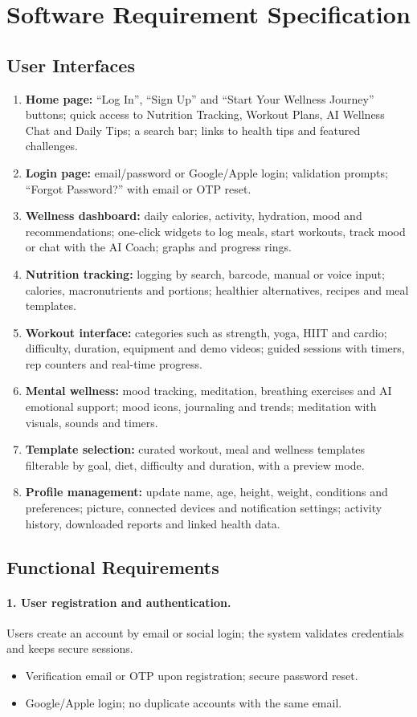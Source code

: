 \documentclass[11pt,a4paper]{report}
\begin{document}
\section{Software Requirement Specification}
\subsection{User Interfaces}
\begin{enumerate}
 \item \textbf{Home page:} ``Log In'', ``Sign Up'' and ``Start Your Wellness Journey'' buttons; quick access to Nutrition Tracking, Workout Plans, AI Wellness Chat and Daily Tips; a search bar; links to health tips and featured challenges.
 \item \textbf{Login page:} email/password or Google/Apple login; validation prompts; ``Forgot Password?'' with email or OTP reset.
 \item \textbf{Wellness dashboard:} daily calories, activity, hydration, mood and recommendations; one-click widgets to log meals, start workouts, track mood or chat with the AI Coach; graphs and progress rings.
 \item \textbf{Nutrition tracking:} logging by search, barcode, manual or voice input; calories, macronutrients and portions; healthier alternatives, recipes and meal templates.
 \item \textbf{Workout interface:} categories such as strength, yoga, HIIT and cardio; difficulty, duration, equipment and demo videos; guided sessions with timers, rep counters and real-time progress.
 \item \textbf{Mental wellness:} mood tracking, meditation, breathing exercises and AI emotional support; mood icons, journaling and trends; meditation with visuals, sounds and timers.
 \item \textbf{Template selection:} curated workout, meal and wellness templates filterable by goal, diet, difficulty and duration, with a preview mode.
 \item \textbf{Profile management:} update name, age, height, weight, conditions and preferences; picture, connected devices and notification settings; activity history, downloaded reports and linked health data.
\end{enumerate}

\subsection{Functional Requirements}
\paragraph{1. User registration and authentication.} Users create an account by email or social login; the system validates credentials and keeps secure sessions.
\begin{itemize}
 \item Verification email or OTP upon registration; secure password reset.
 \item Google/Apple login; no duplicate accounts with the same email.
\end{itemize}
\end{document}

